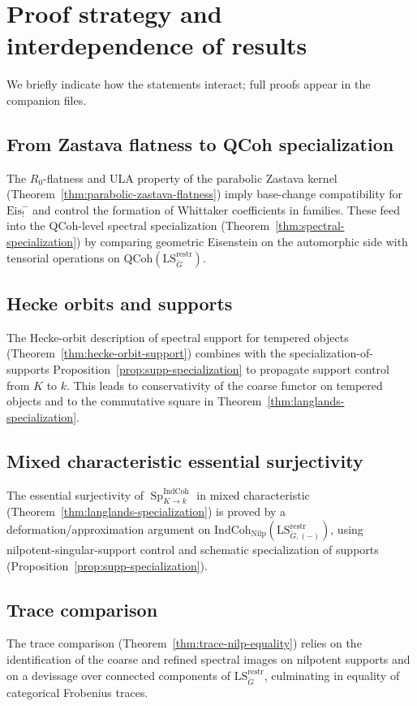 \documentclass[11pt]{article}
\newcommand{\Sp}{\operatorname{Sp}}
\newcommand{\IndCoh}{\mathrm{IndCoh}}
\newcommand{\Nilp}{\mathrm{Nilp}}
\newcommand{\LS}{\mathrm{LS}}
\newcommand{\QCoh}{\mathrm{QCoh}}
\newcommand{\restr}{\mathrm{restr}}
\theoremstyle{plain}
\theoremstyle{definition}
\theoremstyle{remark}
\begin{document}
\section{Proof strategy and interdependence of results}\label{sec:strategy}
We briefly indicate how the statements interact; full proofs appear in the companion files.

\subsection*{From Zastava flatness to QCoh specialization}
The $R_0$-flatness and ULA property of the parabolic Zastava kernel (Theorem~\ref{thm:parabolic-zastava-flatness}) imply base-change compatibility for $\mathrm{Eis}^-_{!}$ and control the formation of Whittaker coefficients in families. These feed into the QCoh-level spectral specialization (Theorem~\ref{thm:spectral-specialization}) by comparing geometric Eisenstein on the automorphic side with tensorial operations on $\QCoh(\LS^{\restr}_{\check G})$.

\subsection*{Hecke orbits and supports}
The Hecke-orbit description of spectral support for tempered objects (Theorem~\ref{thm:hecke-orbit-support}) combines with the specialization-of-supports Proposition~\ref{prop:supp-specialization} to propagate support control from $K$ to $k$. This leads to conservativity of the coarse functor on tempered objects and to the commutative square in Theorem~\ref{thm:langlands-specialization}.

\subsection*{Mixed characteristic essential surjectivity}
The essential surjectivity of $\Sp^{\IndCoh}_{K\to k}$ in mixed characteristic (Theorem~\ref{thm:langlands-specialization}) is proved by a deformation/approximation argument on $\IndCoh_{\Nilp}(\LS^{\restr}_{\check G,(-)})$, using nilpotent-singular-support control and schematic specialization of supports (Proposition~\ref{prop:supp-specialization}).

\subsection*{Trace comparison}
The trace comparison (Theorem~\ref{thm:trace-nilp-equality}) relies on the identification of the coarse and refined spectral images on nilpotent supports and on a devissage over connected components of $\LS^{\restr}_{\check G}$, culminating in equality of categorical Frobenius traces.
\end{document}
